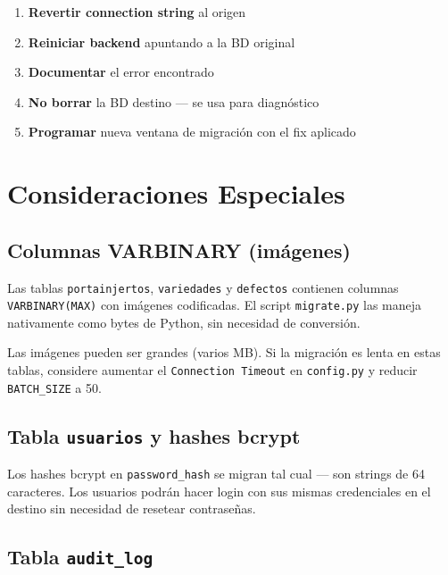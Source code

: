 \documentclass[12pt,a4paper,twoside]{report}
\begin{document}
\begin{enumerate}
    \item \textbf{Revertir connection string} al origen
    \item \textbf{Reiniciar backend} apuntando a la BD original
    \item \textbf{Documentar} el error encontrado
    \item \textbf{No borrar} la BD destino --- se usa para diagn\'ostico
    \item \textbf{Programar} nueva ventana de migraci\'on con el fix aplicado
\end{enumerate}

\chapter{Consideraciones Especiales}

\section{Columnas VARBINARY (im\'agenes)}

Las tablas \texttt{portainjertos}, \texttt{variedades} y \texttt{defectos} contienen columnas \texttt{VARBINARY(MAX)} con im\'agenes codificadas. El script \texttt{migrate.py} las maneja nativamente como bytes de Python, sin necesidad de conversi\'on.

\begin{warningbox}
Las im\'agenes pueden ser grandes (varios MB). Si la migraci\'on es lenta en estas tablas, considere aumentar el \texttt{Connection Timeout} en \texttt{config.py} y reducir \texttt{BATCH\_SIZE} a 50.
\end{warningbox}

\section{Tabla \texttt{usuarios} y hashes bcrypt}

Los hashes bcrypt en \texttt{password\_hash} se migran tal cual --- son strings de 64 caracteres. Los usuarios podr\'an hacer login con sus mismas credenciales en el destino sin necesidad de resetear contrase\~nas.

\section{Tabla \texttt{audit\_log}}
\end{document}
